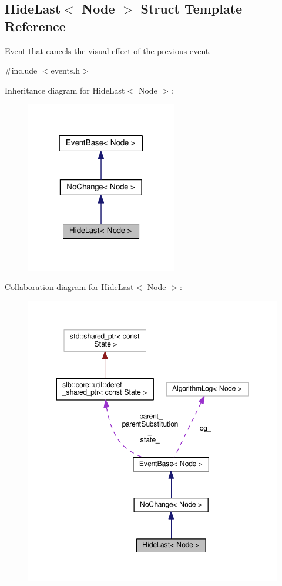 \hypertarget{structHideLast}{}\subsection{Hide\+Last$<$ Node $>$ Struct Template Reference}
\label{structHideLast}


Event that cancels the visual effect of the previous event.  




{\ttfamily \#include $<$events.\+h$>$}



Inheritance diagram for Hide\+Last$<$ Node $>$\+:\nopagebreak
\begin{figure}[H]
\begin{center}
\leavevmode
\includegraphics[width=186pt]{structHideLast__inherit__graph}
\end{center}
\end{figure}


Collaboration diagram for Hide\+Last$<$ Node $>$\+:\nopagebreak
\begin{figure}[H]
\begin{center}
\leavevmode
\includegraphics[width=350pt]{structHideLast__coll__graph}
\end{center}
\end{figure}
